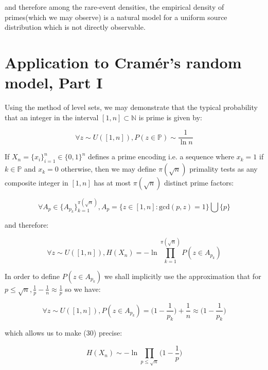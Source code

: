 \documentclass{article}
\begin{document}
and therefore among the rare-event densities, the empirical density of primes(which we may observe) is a natural model for a uniform source distribution which is not directly observable. 

\newpage 

\section{Application to Cramér's random model, Part I}

Using the method of level sets, we may demonstrate that the typical probability that an
integer in the interval $[1,n] \subset \mathbb{N}$ is prime is given by:

\begin{equation}
\forall z \sim U([1,n]), P(z \in \mathbb{P}) \sim \frac{1}{\ln n}
\end{equation}

If $X_n = \{x_i\}_{i=1}^n \in \{0,1\}^n$ defines a prime encoding i.e. a sequence where $x_k = 1$ if $k \in \mathbb{P}$
and $x_k = 0$ otherwise, then we may define $\pi(\sqrt{n})$ primality tests as any composite integer in $[1,n]$
has at most $\pi(\sqrt{n})$ distinct prime factors:

\begin{equation}
\forall A_p \in \{A_{p_k}\}_{k=1}^{\pi(\sqrt{n})}, A_p = \{z \in [1,n]: \text{gcd}(p,z) = 1\} \bigcup \{p\}
\end{equation}

and therefore: 

\begin{equation}
\forall z \sim U([1,n]), H(X_n) = -\ln \prod_{k=1}^{\pi(\sqrt{n})} P(z \in A_{p_k})
\end{equation}

In order to define $P(z \in A_{p_k})$ we shall implicitly use the approximation that for $p \leq \sqrt{n}, \frac{1}{p}-\frac{1}{n} \approx \frac{1}{p}$ so we have:

\begin{equation}
\forall z \sim U([1,n]), P(z \in A_{p_k}) = \big(1-\frac{1}{p_k}\big) + \frac{1}{n} \approx \big(1-\frac{1}{p_k}\big)
\end{equation}

which allows us to make (30) precise:

\begin{equation}
H(X_n) \sim -\ln \prod_{p \leq \sqrt{n}} \big(1-\frac{1}{p}\big)
\end{equation}
\end{document}
